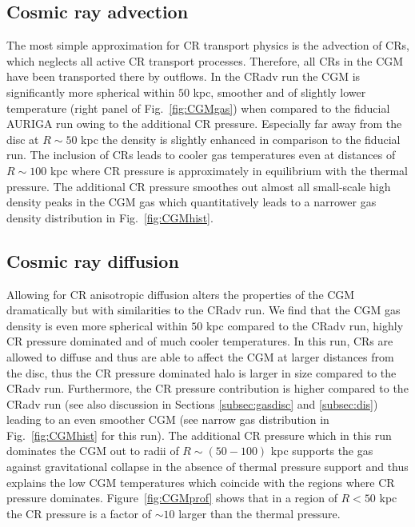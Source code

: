 \documentclass[useAMS,usenatbib]{mnras}
\begin{document}
\subsection{Cosmic ray advection}
The most simple approximation for CR transport physics is the advection of CRs, which neglects all active CR transport processes. Therefore, all CRs in the CGM have been transported there by outflows. In the CRadv run the CGM is significantly more spherical within $50$ kpc, smoother and of slightly lower temperature (right panel of Fig.\ \ref{fig:CGMgas}) when compared to the fiducial AURIGA run owing to the additional CR pressure. Especially far away from the disc at $R\sim50$ kpc the density is slightly enhanced in comparison to the fiducial run. The inclusion of CRs leads to cooler gas temperatures even at distances of $R\sim100$ kpc where CR pressure is approximately in equilibrium with the thermal pressure. The additional CR pressure smoothes out almost all small-scale high density peaks in the CGM gas which quantitatively leads to a narrower gas density distribution in Fig.\ \ref{fig:CGMhist}.

\subsection{Cosmic ray diffusion}
Allowing for CR anisotropic diffusion alters the properties of the CGM dramatically but with similarities to the CRadv run. We find that the CGM gas density is even more spherical within $50$ kpc compared to the CRadv run, highly CR pressure dominated and of much cooler temperatures. In this run, CRs are allowed to diffuse and thus are able to affect the CGM at larger distances from the disc, thus the CR pressure dominated halo is larger in size compared to the CRadv run. Furthermore, the CR pressure contribution is higher compared to the CRadv run (see also discussion in Sections \ref{subsec:gasdisc} and \ref{subsec:dis}) leading to an even smoother CGM (see narrow gas distribution in Fig.\ \ref{fig:CGMhist} for this run). The additional CR pressure which in this run dominates the CGM out to radii of $R\sim(50-100)$ kpc supports the gas against gravitational collapse in the absence of thermal pressure support and thus explains the low CGM temperatures which coincide with the regions where CR pressure dominates. Figure~\ref{fig:CGMprof} shows that in a region of $R<50$ kpc the CR pressure is a factor of $\sim10$ larger than the thermal pressure.
\end{document}
